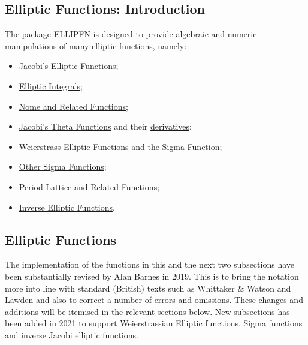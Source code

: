 
\subsection{Elliptic Functions: Introduction}
\hypertarget{ELLIPFNS}{}
\ifdefined{}\fi
%
The package ELLIPFN is designed to provide algebraic and numeric manipulations of
many elliptic functions, namely:

\begin{itemize}
\item \hyperlink{JACEF}{Jacobi's Elliptic Functions};
\item \hyperlink{ELLIPI}{Elliptic Integrals};
\item \hyperlink{ELLIPNOME}{Nome and Related Functions};
\item \hyperlink{JACTF}{Jacobi's Theta Functions} and their
\hyperlink{THETAD}{ derivatives};
\item \hyperlink{WEIERSTRASS}{Weierstrass Elliptic Functions} and the
\hyperlink{SIGMA}{Sigma Function};
\item \hyperlink{SIGMA1}{Other Sigma Functions};
\item \hyperlink{ETA}{Period Lattice and Related Functions};
\item \hyperlink{INVELL}{Inverse Elliptic Functions}.
\end{itemize}

\subsection{Elliptic Functions}
The implementation of the functions in this and the next two subsections have
been substantially revised by Alan Barnes in 2019. This is to bring the
notation more into line with standard (British) texts such as Whittaker
\& Watson \cite{WhittakerWatson:69} and Lawden \cite{Lawden:89} and also to correct
a number of errors and omissions. These changes and additions will be itemised in the relevant
sections below.  New subsections has been added in 2021 to support  Weierstrassian Elliptic
functions, Sigma functions and inverse Jacobi elliptic functions.

